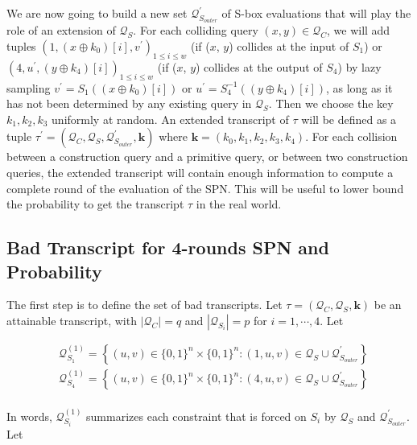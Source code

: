 We are now going to build a new set $\mathcal{Q}_{S_{outer}}^{\prime}$ of S-box evaluations that will play the role of an extension of $\mathcal{Q}_{S}$. For each colliding query $(x, y) \in \mathcal{Q}_{C}$, we will add tuples $\left(1, \left(x \oplus k_{0}\right)[i], v^{\prime}\right)_{1 \leq i \leq w}$ (if ($\mathit{x}$, $\mathit{y}$) collides at the input of $S_1$) or $\left(4, u^{\prime}, \left(y \oplus k_{4}\right)[i]\right)_{1 \leq i \leq w}$ (if ($\mathit{x}$, $\mathit{y}$) collides at the output of $S_4$) by lazy sampling $v^{\prime}=S_{1}(\left(x \oplus k_{0}\right)[i])$ or $u^{\prime}=S_{4}^{-1}(\left(y \oplus k_{4}\right)[i])$, as long as it has not been determined by any existing query in $\mathcal{Q}_{S}$. Then we choose the key $k_1, k_2, k_3$ uniformly at random. An extended transcript of $\tau$ will be defined as a tuple $\tau^{\prime}=\left(\mathcal{Q}_{C}, \mathcal{Q}_{S}, \mathcal{Q}_{S_{outer}}^{\prime}, \mathbf{k}\right)$ where $\mathbf{k}=\left(k_{0}, k_{1}, k_{2},k_{3},k_{4}\right)$. For each collision between a construction query and a primitive query, or between two construction queries, the extended transcript will contain enough information to compute a complete round of the evaluation of the SPN. This will be useful to lower bound the probability to get the transcript $\tau$ in the real world.





\subsection{Bad Transcript for 4-rounds SPN and Probability}
\label{sec:bad-tau-4-rounds}

The first step is to define the set of bad transcripts. Let $\tau = (\mathcal{Q}_C, \mathcal{Q}_{S}, \mathbf{k})$ be an attainable transcript, with $|\mathcal{Q}_C| = q$ and $|\mathcal{Q}_{S_i}| = p$ for $i = 1, \cdots, 4$. Let

$$
\begin{aligned}
&\mathcal{Q}_{S_{1}}^{(1)}=\left\{(u, v) \in\{0,1\}^{n} \times\{0,1\}^{n}:(1, u, v) \in \mathcal{Q}_{S} \cup \mathcal{Q}_{S_{outer}}^{\prime}\right\}\\
&\mathcal{Q}_{S_{4}}^{(1)}=\left\{(u, v) \in\{0,1\}^{n} \times\{0,1\}^{n}:(4, u, v) \in \mathcal{Q}_{S} \cup \mathcal{Q}_{S_{outer}}^{\prime}\right\}\\
\end{aligned}
$$

\noindent In words, $\mathcal{Q}_{S_{i}}^{(1)}$ summarizes each constraint that is forced on $S_{i}$ by $\mathcal{Q}_{S}$ and $\mathcal{Q}_{S_{outer}}^{\prime}$. Let 

